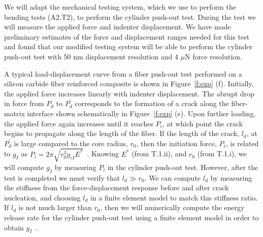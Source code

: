 \documentclass[10pt,letterpaper]{article}
\begin{document}
        We will adapt the mechanical testing system, which we use to perform the bending tests (A2.T2), to perform the cylinder push-out test. During the test we will measure the applied force and indenter displacement.
        We have made preliminary estimates of the force and displacement ranges needed for this test and found that our modified testing system will be able to perform the cylinder push-out test with 50 nm displacement resolution and 4 $\mu$N force resolution.

        A typical load-displacement curve from a fiber push-out test performed on a silicon carbide fiber reinforced composite is shown in Figure~\ref{f:exp} (f).
        Initially, the applied force increases linearly with indenter displacement.
        The abrupt drop in force from $P_d$ to $P_d^\prime$ corresponds to the formation of a crack along the fiber-matrix interface shown schematically in Figure~\ref{f:exp} (e).
        Upon further loading, the  applied force again increases until it reaches $P_i$, at which point the crack begins to propagate along the length of the fiber.
        If the length of the crack, $l_d$, at $P_d^\prime$ is large compared to the core radius, $r_0$, then the initiation force, $P_i$, is related to $g_{I}$ as $P_i=2\pi \sqrt{r_0^3 g_{cI} E^*}$~\cite{outwater1970fracture, kerans1991theoretical, liang1993mechanics}.
        Knowing $E^*$ (from T.1.ii), and $r_0$ (from T.1.i), we will compute $g_{I}$ by measuring $P_i$ in the cylinder push-out test. However, after the test is completed we must verify that $l_d \gg r_0$.
        We can compute $l_d$ by measuring the stiffness from the force-displacement response before and after crack nucleation, and choosing $l_d$ in a finite element model to match this stiffness ratio.
        If $l_d$ is not much larger than $r_0$, then we will numerically compute the energy release rate for the cylinder push-out test using a finite element model in order to obtain $g_I$~\cite{moran1987crack}.
\end{document}

